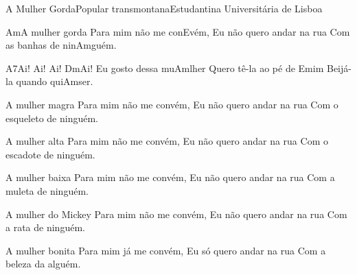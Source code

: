\begin{musica}{A Mulher Gorda}{Popular transmontana}{Estudantina Universitária de Lisboa}

\ac{Am}{A} mulher gorda
Para mim não me con\ac{E}{vém},
Eu não quero andar na rua
Com as banhas de nin\ac{Am}{guém}. 

\ac{A7}{Ai}! Ai! Ai! \ac{Dm}{Ai}!
Eu gosto dessa mu\ac{Am}{lher}
Quero tê-la ao pé de \ac{E}{mim}
Beijá-la quando qui\ac{Am}{ser}. 

A mulher magra
Para mim não me convém,
Eu não quero andar na rua
Com o esqueleto de ninguém. 

A mulher alta
Para mim não me convém,
Eu não quero andar na rua
Com o escadote de ninguém. 

A mulher baixa
Para mim não me convém,
Eu não quero andar na rua
Com a muleta de ninguém. 

A mulher do Mickey
Para mim não me convém,
Eu não quero andar na rua
Com a rata de ninguém. 

A mulher bonita
Para mim já me convém,
Eu só quero andar na rua
Com a beleza da alguém. 

\end{musica}

